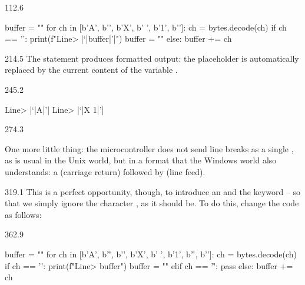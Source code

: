 \documentclass{aslab}
\newcommand*\codex[1]{\fontsize{10bp}{#1bp}\ttfamily\lineskiplimit=-\maxdimen}
\begin{document}
\begin{region}[x=74.7,right=0,pitch=12.1]{112.6}
\begin{codeblock}[style=curly,basicstyle=\codex{12.1}]
buffer = ""
for ch in [b'A', b'\n', b'X', b' ', b'1', b'\n']:
    ch = bytes.decode(ch)
    if ch == '\n':
        print(f"Line> |\textquoteleft|{buffer}|\textquoteright|")
        buffer = ""
    else:
        buffer += ch
\end{codeblock}
\end{region}

\begin{region}[x=74.7,right=0,pitch=13.5]{214.5}
The statement  produces formatted output:
the placeholder  is automatically replaced by the current content
of the variable .
\end{region}

\begin{region}[x=74.7,right=0,pitch=12.1]{245.2}
\begin{codeblock}[style=curly,basicstyle=\codex{12.1}]
Line> |\textquoteleft|A|\textquoteright|
Line> |\textquoteleft|X 1|\textquoteright|
\end{codeblock}
\end{region}

\begin{region}[pitch=13.45]{274.3}
\begin{tasks}[start=8]
\item One more little thing: the microcontroller does not send line breaks as
  a single , as is usual in the Unix world, but in a format that
  the Windows world also understands: a  (carriage return)
  followed by  (line feed).
\end{tasks}
\end{region}

\begin{region}[x=74.7,right=0,pitch=13.4]{319.1}
This is a perfect opportunity, though, to introduce an  and the
keyword  -- so that we simply ignore the character \code{\r}, as
it should be. To do this, change the code as follows:
\end{region}

\begin{region}[x=74.7,right=0,pitch=12.1]{362.9}
\begin{codeblock}[basicstyle=\codex{12.1}]
buffer = ""
for ch in [b'A', b'\r', b'\n', b'X', b' ', b'1', b'\r', b'\n']:
    ch = bytes.decode(ch)
    if ch == '\n':
        print(f"Line> {buffer}")
        buffer = ""
    elif ch == '\r':
        pass
    else:
        buffer += ch
\end{codeblock}
\end{region}
\end{document}
